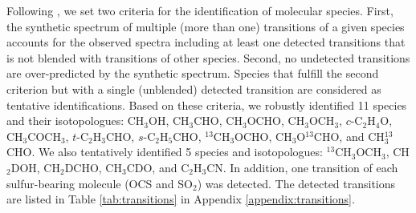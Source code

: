 \documentclass[twocolumn, twocolappendix, astrosymb, times]{aastex631}
\newcommand{\methanol}{CH$_3$OH\xspace}
\newcommand{\acetaldehyde}{CH$_3$CHO\xspace}
\newcommand{\methylformate}{CH$_3$OCHO\xspace}
\newcommand{\dimethylether}{CH$_3$OCH$_3$\xspace}
\newcommand{\acetone}{CH$_3$COCH$_3$\xspace}
\newcommand{\ethyleneoxide}{$c$-C$_2$H$_4$O\xspace}
\newcommand{\propenal}{$t$-C$_2$H$_3$CHO\xspace}
\newcommand{\propanal}{$s$-C$_2$H$_5$CHO\xspace}
\begin{document}
Following \citet{Jorgensen2020}, we set two criteria for the identification of molecular species. First, the synthetic spectrum of multiple (more than one) transitions of a given species accounts for the observed spectra including at least one detected transitions that is not blended with transitions of other species. Second, no undetected transitions are over-predicted by the synthetic spectrum. Species that fulfill the second criterion but with a single (unblended) detected transition are considered as tentative identifications. Based on these criteria, we robustly identified 11 species and their isotopologues: \methanol, \acetaldehyde, \methylformate, \dimethylether, \ethyleneoxide, \acetone, \propenal, \propanal, $^{13}$CH$_3$OCHO, CH$_3$O$^{13}$CHO, and CH$_3^{13}$CHO. We also tentatively identified 5 species and isotopologues: $^{13}$CH$_3$OCH$_3$, CH$_2$DOH, CH$_2$DCHO, CH$_3$CDO, and C$_2$H$_3$CN. In addition, one transition of each sulfur-bearing molecule (OCS and SO$_2$) was detected. The detected transitions are listed in Table \ref{tab:transitions} in Appendix \ref{appendix:transitions}.




\begin{figure*}
\caption{Spectra corrected for Keplerian rotation toward the V883 Ori disk (gray). The model spectra for each species are shown in colored lines. }
\label{fig:spectra_gallery}
\end{figure*}

\begin{figure*}
\caption{Velocity-integrated intensity maps of the molecular line emission in the V883 Ori disk. The velocity range for integration are $\pm3.5$ km s$^{-1}$ with respect to the source systemic velocity $v_\mathrm{sys}=4.25$ km s$^{-1}$ \citep{Tobin2023} including \dimethylether and \acetone, where multiple blended transitions are integrated together. The molecular species, transitions, and upper state energy levels are indicated in the upper-left corner of each panel. The black contours start from 5$\sigma$ with steps of 2.5$\sigma$, where $\sigma$ are the noise level of each map measured on the emission-free region. The synthesized beam and a scale bar of 80 au are shown in the lower left and right corner of each panel, respectively.}
\label{fig:moment_zero_gallery}
\end{figure*}
\end{document}
